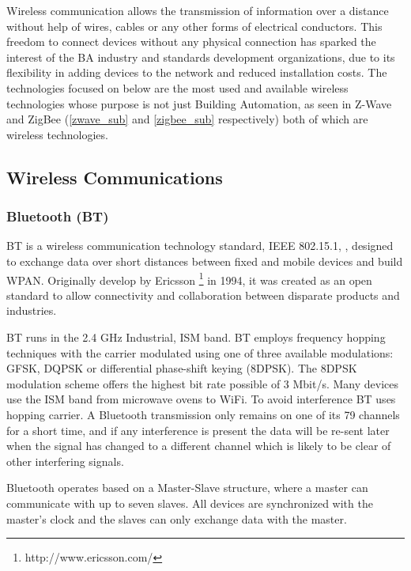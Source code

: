 Wireless communication allows the transmission of information over a distance without help of wires, cables or any other forms of electrical conductors. This freedom to connect devices without any physical connection has sparked the interest of the BA industry and standards development organizations, due to its flexibility in adding devices to the network and reduced installation costs. 
The technologies focused on below are the most used and available wireless technologies whose purpose is not just Building Automation, as seen in Z-Wave and ZigBee (\ref{zwave_sub} and \ref{zigbee_sub} respectively) both of which are wireless technologies. 


\subsection{Wireless Communications}

\subsubsection{Bluetooth (BT)}

\ac{BT} is a wireless communication technology standard, \ac{IEEE} 802.15.1, \cite{std_802.15.1,comunication:bt,comunication:bt_specification}, designed to exchange data over short distances between fixed and mobile devices and build \ac{WPAN}. Originally develop by Ericsson \footnote{http://www.ericsson.com/} in 1994, it was created as an open standard to allow connectivity and collaboration between disparate products and industries.

\ac{BT} runs in the 2.4 GHz Industrial, \ac{ISM} band. \ac{BT} employs frequency hopping techniques with the carrier modulated using one of three available modulations: \ac{GFSK}, \ac{DQPSK} or differential phase-shift keying (8DPSK). The 8DPSK modulation scheme offers the highest bit rate possible of 3  Mbit/s. Many devices use the ISM band from microwave ovens to \ac{WiFi}. To avoid interference BT uses hopping carrier. A Bluetooth transmission only remains on one of its 79 channels for a short time, and if any interference is present the data will be re-sent later when the signal has changed to a different channel which is likely to be clear of other interfering signals.

Bluetooth operates based on a Master-Slave structure, where a master can communicate with up to seven slaves. All devices are synchronized with the master's clock and the slaves can only exchange data with the master.

